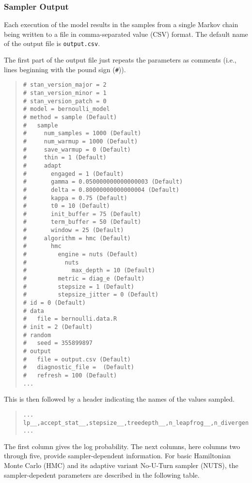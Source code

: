 \subsubsection{Sampler Output}

Each execution of the model results in the samples from a single
Markov chain being written to a file in comma-separated value (CSV) format.
The default name of the output file is \nolinkurl{output.csv}.

The first part of the output file just repeats the parameters
as comments (i.e., lines beginning with the pound sign (\Verb|#|)).
%
\begin{quote}
\begin{Verbatim}[fontsize=\small]
# stan_version_major = 2
# stan_version_minor = 1
# stan_version_patch = 0
# model = bernoulli_model
# method = sample (Default)
#   sample
#     num_samples = 1000 (Default)
#     num_warmup = 1000 (Default)
#     save_warmup = 0 (Default)
#     thin = 1 (Default)
#     adapt
#       engaged = 1 (Default)
#       gamma = 0.050000000000000003 (Default)
#       delta = 0.80000000000000004 (Default)
#       kappa = 0.75 (Default)
#       t0 = 10 (Default)
#       init_buffer = 75 (Default)
#       term_buffer = 50 (Default)
#       window = 25 (Default)
#     algorithm = hmc (Default)
#       hmc
#         engine = nuts (Default)
#           nuts
#             max_depth = 10 (Default)
#         metric = diag_e (Default)
#         stepsize = 1 (Default)
#         stepsize_jitter = 0 (Default)
# id = 0 (Default)
# data
#   file = bernoulli.data.R
# init = 2 (Default)
# random
#   seed = 355899897
# output
#   file = output.csv (Default)
#   diagnostic_file =  (Default)
#   refresh = 100 (Default)
...
\end{Verbatim}
\end{quote}
%
This is then followed by a header indicating the
names of the values sampled.
%
\begin{quote}
\begin{Verbatim}[fontsize=\small]
...
lp__,accept_stat__,stepsize__,treedepth__,n_leapfrog__,n_divergent__,theta
...
\end{Verbatim}
\end{quote}
%
The first column gives the log probability.  The next columns, here
columns two through five, provide sampler-dependent information. For
basic Hamiltonian Monte Carlo (HMC) and its adaptive variant No-U-Turn
sampler (NUTS), the sampler-depedent parameters are described in the
following table.
%
